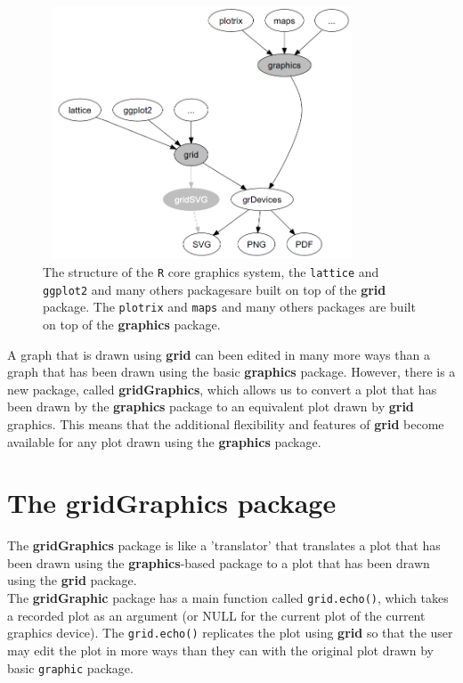 \documentclass[paper=a4, fontsize=11pt]{report}
\begin{document}
\begin{figure}[h]
	\begin{center}
		\includegraphics[height = 7.5cm, width = 9.5cm]{figure/intro.png}
		\caption{The structure of the \texttt{R} core graphics system, the \texttt{lattice} and \texttt{ggplot2} and many others packagesare built on top of the \textbf{grid} package. The \texttt{plotrix} and \texttt{maps} and many others packages are built on top of the \textbf{graphics} package. }
		\label{intro}
	\end{center}
\end{figure}

A graph that is drawn using \textbf{grid} can been edited in many more ways than a graph that has been drawn using the basic \textbf{graphics} package. However, there is a new package, called \textbf{gridGraphics}, which allows us to convert a plot that has been drawn by the \textbf{graphics} package to an equivalent plot drawn by \textbf{grid} graphics. This means that the additional flexibility and features of \textbf{grid} become available for any plot drawn using the \textbf{graphics} package. \\

\section{The \textbf{gridGraphics} package}
The \textbf{gridGraphics} package is like a 'translator' that translates a plot that has been drawn using the \textbf{graphics}-based package to a plot that has been drawn using the \textbf{grid} package. \\

The \textbf{gridGraphic} package has a main function called \texttt{grid.echo()}, which takes a recorded plot as an argument (or NULL for the current plot of the current graphics device). The \texttt{grid.echo()} replicates the plot using \textbf{grid} so that the user may edit the plot in more ways than they can with the original plot drawn by basic \texttt{graphic} package.\\
\end{document}
